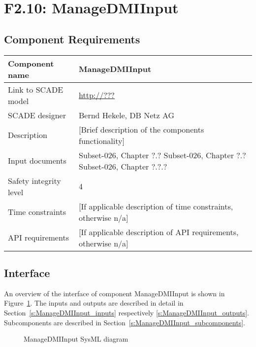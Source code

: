 
\section{F2.10: ManageDMIInput}


\subsection{Component Requirements}

\begin{longtable}{p{}p{}}
\toprule
Component name			& ManageDMIInput \\
\midrule
Link to SCADE model		& {\footnotesize \url{http://???}} \\
\midrule
SCADE designer			& Bernd Hekele, DB Netz AG \\
\midrule
Description				& [Brief description of the components functionality] \\
\midrule
Input documents	& 
Subset-026, Chapter ?.?\newline
Subset-026, Chapter ?.?\newline
Subset-026, Chapter ?.?.?\\
\midrule
Safety integrity level		& 4 \\
\midrule
Time constraints		& [If applicable description of time constraints, otherwise n/a] \\
\midrule
API requirements 		& [If applicable description of API requirements, otherwise n/a] \\
\bottomrule
\end{longtable}


\subsection{Interface}

An overview of the interface of component ManageDMIInput is shown in Figure~\ref{f:ManageDMIInput}. The inputs and outputs are described in detail in Section~\ref{s:ManageDMIInput_inputs} respectively \ref{s:ManageDMIInput_outputs}. Subcomponents are described in Section~\ref{s:ManageDMIInput_subcomponents}.

\begin{figure}
\center
{}
\caption{ManageDMIInput SysML diagram}\label{f:ManageDMIInput}
\end{figure}


